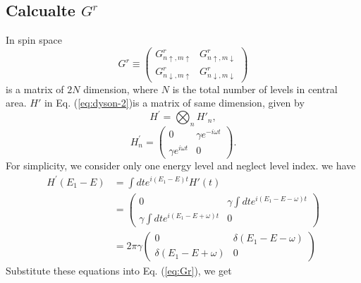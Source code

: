 \documentclass[11pt,a4paper]{article}
\begin{document}
\subsection{Calcualte $G^{r}$}
In spin space
\begin{equation}
G^{r}\equiv\left(\begin{array}{cc}
G_{n\uparrow,m\uparrow}^{r} & G_{n\uparrow,m\downarrow}^{r} \\
G_{n\downarrow,m\uparrow}^{r} & G_{n\downarrow,m\downarrow}^{r}
\end{array}\right)
\label{eq:Gr2}
\end{equation}
is a matrix of $2N$ dimension, where $N$ is the total number of levels in central area. $H'$ in Eq. (\ref{eq:dyson-2})is a matrix of same dimension, given by
\begin{equation}
H^{\prime}= \bigotimes_{n} H'_{n},
\end{equation}
\begin{equation}
H_{n}^{\prime}=\left(\begin{array}{cc}
0 & \gamma e^{-i \omega t} \\
\gamma e^{i \omega t} & 0
\end{array}\right).
\end{equation}
For simplicity, we consider only one energy level and neglect level index. we have
\begin{equation}
\begin{split}
H^{\prime}(E_{1}-E)&= \int dt e^{i(E_{1}-E)t} H'(t)\\
&=\left(\begin{array}{cc}
0 & \gamma\int dt e^{i(E_{1}-E-\omega)t}\\
\gamma\int dt e^{i(E_{1}-E+\omega)t} & 0
\end{array}\right) \\
&=2\pi\gamma\left(\begin{array}{cc}
0 & \delta(E_{1}-E-\omega)\\
\delta(E_{1}-E+\omega) & 0
\end{array}\right)
\end{split}
\end{equation}
Substitute these equations into Eq. (\ref{eq:Gr}), we get
\end{document}
